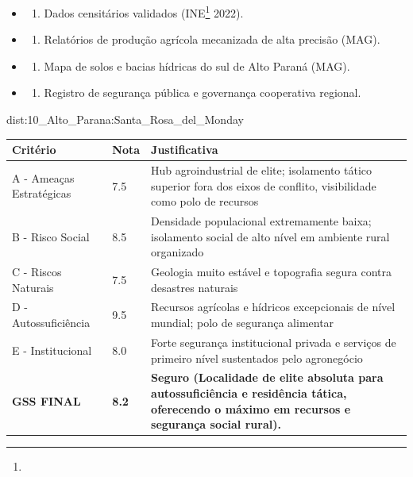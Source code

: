 {\begin{itemize}
\tightlist
\item
  \begin{enumerate}
  \def\labelenumi{\arabic{enumi})}
  \tightlist
  \item
    Dados censitários validados (INE\footnote{\fineINE} 2022).
  \end{enumerate}
\item
  \begin{enumerate}
  \def\labelenumi{\arabic{enumi})}
  \setcounter{enumi}{1}
  \tightlist
  \item
    Relatórios de produção agrícola mecanizada de alta precisão (MAG).
  \end{enumerate}
\item
  \begin{enumerate}
  \def\labelenumi{\arabic{enumi})}
  \setcounter{enumi}{2}
  \tightlist
  \item
    Mapa de solos e bacias hídricas do sul de Alto Paraná (MAG).
  \end{enumerate}
\item
  \begin{enumerate}
  \def\labelenumi{\arabic{enumi})}
  \setcounter{enumi}{3}
  \tightlist
  \item
    Registro de segurança pública e governança cooperativa regional.
  \end{enumerate}
\end{itemize}}{dist:10_Alto_Parana:Santa_Rosa_del_Monday}
\begin{table}[ht!]
\small \begin{tabular}{p{3.0cm}p{0.8cm}p{6.0cm}} \toprule
\textbf{Critério} & \textbf{Nota} & \textbf{Justificativa} \\ \midrule
A - Ameaças Estratégicas & 7.5 & Hub agroindustrial de elite; isolamento tático superior fora dos eixos de conflito, visibilidade como polo de recursos \\
B - Risco Social & 8.5 & Densidade populacional extremamente baixa; isolamento social de alto nível em ambiente rural organizado \\
C - Riscos Naturais & 7.5 & Geologia muito estável e topografia segura contra desastres naturais \\
D - Autossuficiência & 9.5 & Recursos agrícolas e hídricos excepcionais de nível mundial; polo de segurança alimentar \\
E - Institucional & 8.0 & Forte segurança institucional privada e serviços de primeiro nível sustentados pelo agronegócio \\
\midrule \textbf{GSS FINAL} & \textbf{8.2} & \textbf{Seguro (Localidade de elite absoluta para autossuficiência e residência tática, oferecendo o máximo em recursos e segurança social rural).} \\ \bottomrule \end{tabular}
\end{table}
